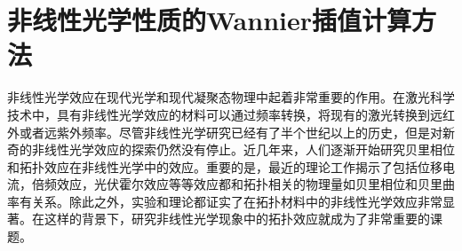 \chapter{非线性光学性质的Wannier插值计算方法}

非线性光学效应在现代光学和现代凝聚态物理中起着非常重要的作用。在激光科学技术中，具有非线性光学效应的材料可以通过频率转换，将现有的激光转换到远红外或者远紫外频率。尽管非线性光学研究已经有了半个世纪以上的历史，但是对新奇的非线性光学效应的探索仍然没有停止。近几年来，人们逐渐开始研究贝里相位和拓扑效应在非线性光学中的效应。重要的是，最近的理论工作揭示了包括位移电流，倍频效应，光伏霍尔效应等等效应都和拓扑相关的物理量如贝里相位和贝里曲率有关系。除此之外，实验和理论都证实了在拓扑材料中的非线性光学效应非常显著。在这样的背景下，研究非线性光学现象中的拓扑效应就成为了非常重要的课题。


